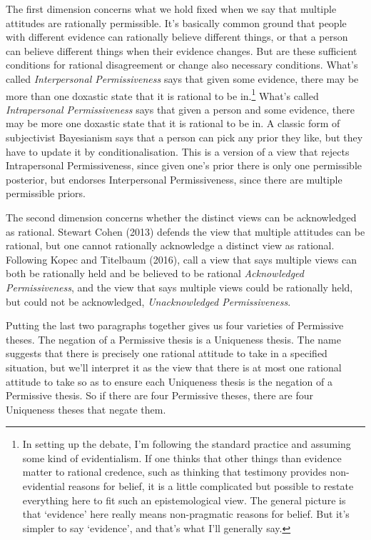 \documentclass[
  11pt,
]{article}
\begin{document}
The first dimension concerns what we hold fixed when we say that multiple attitudes are rationally permissible. It's basically common ground that people with different evidence can rationally believe different things, or that a person can believe different things when their evidence changes. But are these sufficient conditions for rational disagreement or change also necessary conditions. What's called \emph{Interpersonal Permissiveness} says that given some evidence, there may be more than one doxastic state that it is rational to be in.\footnote{In setting up the debate, I'm following the standard practice and assuming some kind of evidentialism. If one thinks that other things than evidence matter to rational credence, such as thinking that testimony provides non-evidential reasons for belief, it is a little complicated but possible to restate everything here to fit such an epistemological view. The general picture is that `evidence' here really means non-pragmatic reasons for belief. But it's simpler to say `evidence', and that's what I'll generally say.} What's called \emph{Intrapersonal Permissiveness} says that given a person and some evidence, there may be more one doxastic state that it is rational to be in. A classic form of subjectivist Bayesianism says that a person can pick any prior they like, but they have to update it by conditionalisation. This is a version of a view that rejects Intrapersonal Permissiveness, since given one's prior there is only one permissible posterior, but endorses Interpersonal Permissiveness, since there are multiple permissible priors.

The second dimension concerns whether the distinct views can be acknowledged as rational. Stewart Cohen (2013) defends the view that multiple attitudes can be rational, but one cannot rationally acknowledge a distinct view as rational. Following Kopec and Titelbaum (2016), call a view that says multiple views can both be rationally held and be believed to be rational \emph{Acknowledged Permissiveness}, and the view that says multiple views could be rationally held, but could not be acknowledged, \emph{Unacknowledged Permissiveness}.

Putting the last two paragraphs together gives us four varieties of Permissive theses. The negation of a Permissive thesis is a Uniqueness thesis. The name suggests that there is precisely one rational attitude to take in a specified situation, but we'll interpret it as the view that there is at most one rational attitude to take so as to ensure each Uniqueness thesis is the negation of a Permissive thesis. So if there are four Permissive theses, there are four Uniqueness theses that negate them.
\end{document}
